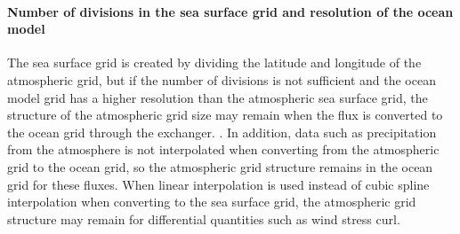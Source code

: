 \hypertarget{number-of-divisions-in-the-sea-surface-grid-and-resolution-of-the-ocean-model}{%
\paragraph{Number of divisions in the sea surface grid and resolution of
the ocean
model}\label{number-of-divisions-in-the-sea-surface-grid-and-resolution-of-the-ocean-model}}

The sea surface grid is created by dividing the latitude and longitude
of the atmospheric grid, but if the number of divisions is not
sufficient and the ocean model grid has a higher resolution than the
atmospheric sea surface grid, the structure of the atmospheric grid size
may remain when the flux is converted to the ocean grid through the
exchanger. . In addition, data such as precipitation from the atmosphere
is not interpolated when converting from the atmospheric grid to the
ocean grid, so the atmospheric grid structure remains in the ocean grid
for these fluxes. When linear interpolation is used instead of cubic
spline interpolation when converting to the sea surface grid, the
atmospheric grid structure may remain for differential quantities such
as wind stress curl.
